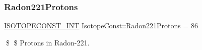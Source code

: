 \subsubsection{\texorpdfstring{Radon221\+Protons}{Radon221Protons}}
{\footnotesize\ttfamily \mbox{\hyperlink{group___isotope_const-_macros_ga5f18360b3e99483a35c32d789e62621c}{I\+S\+O\+T\+O\+P\+E\+C\+O\+N\+S\+T\+\_\+\+I\+NT}} Isotope\+Const\+::\+Radon221\+Protons = 86}

\$ \$ Protons in Radon-\/221. 